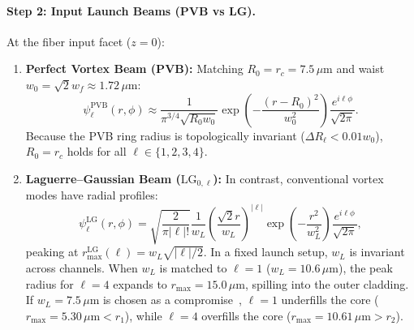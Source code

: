 \documentclass{optica-article}
\begin{document}
\paragraph{Step 2: Input Launch Beams (PVB vs LG).}
At the fiber input facet ($z = 0$):
\begin{enumerate}
    \item \textbf{Perfect Vortex Beam (PVB):} Matching $R_0 = r_c = 7.5\,\mu\text{m}$ and waist $w_0 = \sqrt{2} w_f \approx 1.72\,\mu\text{m}$:
    \begin{equation}
    \psi_\ell^{\text{PVB}}(r, \phi) \approx \frac{1}{\pi^{3/4} \sqrt{R_0 w_0}} \exp\left( - \frac{(r - R_0)^2}{w_0^2} \right) \frac{e^{i \ell \phi}}{\sqrt{2\pi}}.
    \label{eq:pvb_input}
    \end{equation}
    Because the PVB ring radius is topologically invariant ($\Delta R_\ell < 0.01 w_0$), $R_0 = r_c$ holds for all $\ell \in \{1, 2, 3, 4\}$.
    \item \textbf{Laguerre--Gaussian Beam ($\text{LG}_{0, \ell}$):} In contrast, conventional vortex modes have radial profiles:
    \begin{equation}
    \psi_\ell^{\text{LG}}(r, \phi) = \sqrt{\frac{2}{\pi |\ell|!}} \frac{1}{w_L} \left( \frac{\sqrt{2} r}{w_L} \right)^{|\ell|} \exp\left( - \frac{r^2}{w_L^2} \right) \frac{e^{i \ell \phi}}{\sqrt{2\pi}},
    \label{eq:lg_input}
    \end{equation}
    peaking at $r_{\max}^{\text{LG}}(\ell) = w_L \sqrt{|\ell|/2}$. In a fixed launch setup, $w_L$ is invariant across channels. When $w_L$ is matched to $\ell=1$ ($w_L = 10.6\,\mu\text{m}$), the peak radius for $\ell=4$ expands to $r_{\max} = 15.0\,\mu\text{m}$, spilling into the outer cladding. If $w_L = 7.5\,\mu\text{m}$ is chosen as a compromise~\cite{Villalba2023}, $\ell=1$ underfills the core ($r_{\max} = 5.30\,\mu\text{m} < r_1$), while $\ell=4$ overfills the core ($r_{\max} = 10.61\,\mu\text{m} > r_2$).
\end{enumerate}
\end{document}
